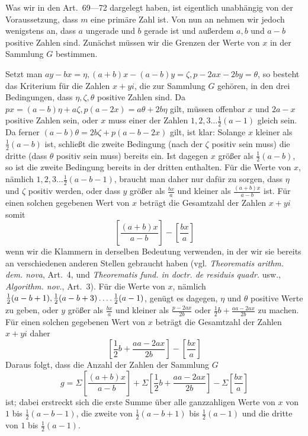 \newpage
{}
Was wir in den Art.~69---72 dargelegt haben, ist eigentlich unabhängig von der Voraussetzung, dass $m$ eine primäre Zahl ist. Von nun an nehmen wir jedoch wenigstens an, dass $a$ ungerade und $b$ gerade ist und außerdem $a,b$ und $a-b$ positive Zahlen sind. Zunächst müssen wir die Grenzen der Werte von $x$ in der Sammlung $G$ bestimmen.

%
Setzt man $ay-bx=\eta,(a+b)x-(a-b)y=\zeta,p-2ax-2by=\theta$, so besteht das Kriterium für die Zahlen $x+yi$, die zur Sammlung $G$ gehören, in den drei Bedingungen, dass $\eta,\zeta,\theta$ positive Zahlen sind. Da $px=(a-b)\eta+a\zeta,p(a-2x)=a\theta+2b\eta$ gilt, müssen offenbar $x$ und $2a-x$ positive Zahlen sein, oder $x$ muss einer der Zahlen $1,2,3\ldots\frac12(a-1)$ gleich sein. Da ferner $(a-b)\theta=2b\zeta+p(a-b-2x)$ gilt, ist klar: Solange $x$ kleiner als $\frac12(a-b)$ ist, schließt die zweite Bedingung (nach der $\zeta$ positiv sein muss) die dritte (dass $\theta$ positiv sein muss) bereits ein. Ist dagegen $x$ größer als $\frac12(a-b)$, so ist die zweite Bedingung bereits in der dritten enthalten. Für die Werte von $x$, nämlich $1,2,3\ldots\frac12(a-b-1)$, braucht man daher nur dafür zu sorgen, dass $\eta$ und $\zeta$ positiv werden, oder dass $y$ größer als $\frac{bx}{a}$ und kleiner als $\frac{(a+b)x}{a-b}$ ist. Für einen solchen gegebenen Wert von $x$ beträgt die Gesamtzahl der Zahlen $x+yi$ somit
\[
\left[\frac{(a+b)x}{a-b}\right]-\left[\frac{bx}{a}\right]
\]
wenn wir die Klammern in derselben Bedeutung verwenden, in der wir sie bereits an verschiedenen anderen Stellen gebraucht haben (vgl. \emph{Theorematis arithm. dem. nova}, Art.~4, und \emph{Theorematis fund. in doctr. de residuis quadr.} usw., \emph{Algorithm. nov.}, Art.~3). Für die Werte von $x$, nämlich $\frac12(a-b+1),\frac12(a-b+3)\mathinner{.\,.\,.\,.}\frac12(a-1)$, genügt es dagegen, $\eta$ und $\theta$ positive Werte zu geben, oder $y$ größer als $\frac{bx}{a}$ und kleiner als $\frac{p-2ax}{2b}$ oder $\frac12b+\frac{aa-2ax}{2b}$ zu machen. Für einen solchen gegebenen Wert von $x$ beträgt die Gesamtzahl der Zahlen $x+yi$ daher
\[
\left[\frac12b+\frac{aa-2ax}{2b}\right]-\left[\frac{bx}{a}\right]
\]
Daraus folgt, dass die Anzahl der Zahlen der Sammlung $G$
\[
g=\Sigma\left[\frac{(a+b)x}{a-b}\right]+\Sigma\left[\frac12b+\frac{aa-2ax}{2b}\right]-\Sigma\left[\frac{bx}{a}\right]
\]
ist; dabei erstreckt sich die erste Summe über alle ganzzahligen Werte von $x$ von $1$ bis $\frac12(a-b-1)$, die zweite von $\frac12(a-b+1)$ bis $\frac12(a-1)$ und die dritte von $1$ bis $\frac12(a-1)$.

